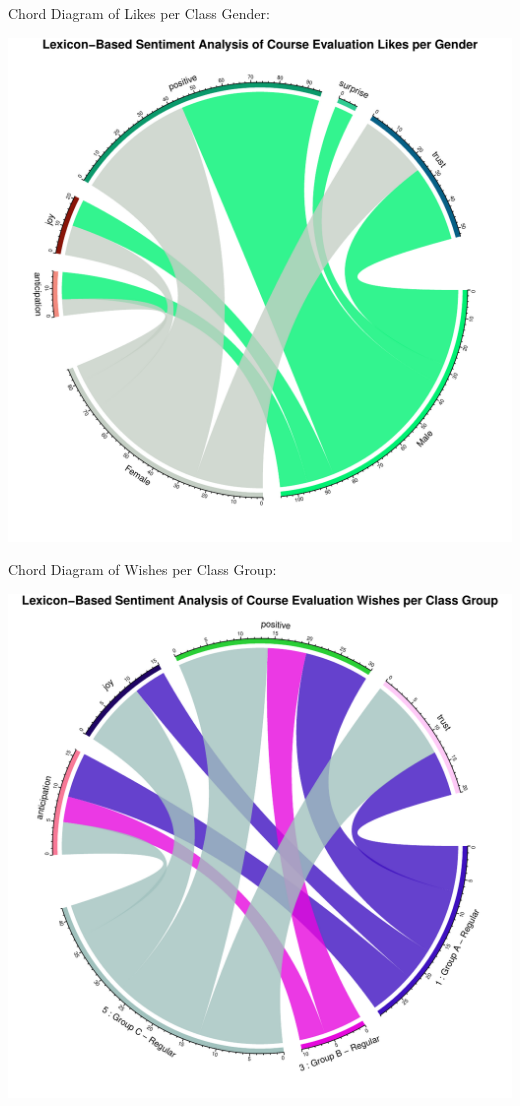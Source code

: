 \documentclass[
]{article}
\begin{document}
\newpage

Chord Diagram of Likes per Class Gender:

\includegraphics{AnalysisOfCourseEvaluation-Notebook_files/figure-latex/ChordDiagramLikesPerGender-1.pdf}

\newpage

Chord Diagram of Wishes per Class Group:

\includegraphics{AnalysisOfCourseEvaluation-Notebook_files/figure-latex/ChordDiagramPerGroup_Wishes-1.pdf}
\end{document}
